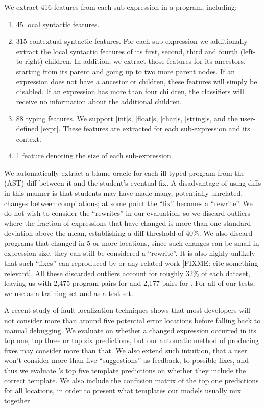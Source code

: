 We extract 416 features from each sub-expression in a
program, including:
%
\begin{enumerate}
  \item 45 local syntactic features.
  \item 315 contextual syntactic features. For each sub-expression we
    additionally extract the local syntactic features of its first, second,
    third and fourth (left-to-right) children. In addition, we extract those
    features for its ancestors, starting from its parent and going up to two
    more parent nodes. If an expression does not have a ancestor or children,
    these features will simply be disabled. If an expression has more than four
    children, the classifiers will receive no information about the additional
    children.
  \item 88 typing features. We support |int|s, |float|s, |char|s, |string|s, and
    the user-defined |expr|. These features are extracted for each
    sub-expression and its context.
  \item 1 feature denoting the size of each sub-expression.
\end{enumerate}

We automatically extract a blame oracle for each ill-typed program from the
(AST) diff between it and the student's eventual fix. A disadvantage of using
diffs in this manner is that students may have made many, potentially unrelated,
changes between compilations; at some point the ``fix'' becomes a ``rewrite''.
We do not wish to consider the ``rewrites'' in our evaluation, so we discard
outliers where the fraction of expressions that have changed is more than one
standard deviation above the mean, establishing a diff threshold of 40\%. We
also discard programs that changed in 5 or more locations, since such changes
can be small in expression size, they can still be considered a ``rewrite''. It
is also highly unlikely that such ``fixes'' can reproduced by \toolname or any
related work [FIXME: cite something relevant]. All these discarded outliers
account for roughly 32\% of each dataset, leaving us with 2,475 program pairs
for \SPRING and 2,177 pairs for \FALL. For all of our tests, we use \SPRING as a
training set and \FALL as a test set.

A recent study of fault localization techniques \citep[][]{Kochhar2016-oc} shows
that most developers will not consider more than around five potential error
locations before falling back to manual debugging. We evaluate \toolname on
whether a changed expression occurred in its top one, top three or top six
predictions, but our automatic method of producing fixes may consider more than
that. We also extend such intuition, that a user won't consider more than five
``suggestions'' as feedback, to possible fixes, and thus we evaluate \toolname's
top five template predictions on whether they include the correct template. We
also include the confusion matrix of the top one predictions for all locations,
in order to present what templates our models usually mix together.

